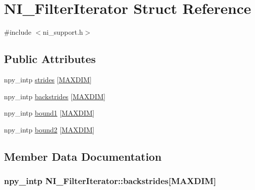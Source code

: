 \hypertarget{structNI__FilterIterator}{}\section{N\+I\+\_\+\+Filter\+Iterator Struct Reference}
\label{structNI__FilterIterator}


{\ttfamily \#include $<$ni\+\_\+support.\+h$>$}

\subsection*{Public Attributes}
\begin{DoxyCompactItemize}
\item 
npy\+\_\+intp \hyperlink{structNI__FilterIterator_a50a693fb2d87ac49ebee590fea850e52}{strides} \mbox{[}\hyperlink{nd__image_8h_a674c1a85fb1c09ec56b0b8f6319e7b97}{M\+A\+X\+D\+I\+M}\mbox{]}
\item 
npy\+\_\+intp \hyperlink{structNI__FilterIterator_ad447e7b690b7bc0d438d01a0f0247d12}{backstrides} \mbox{[}\hyperlink{nd__image_8h_a674c1a85fb1c09ec56b0b8f6319e7b97}{M\+A\+X\+D\+I\+M}\mbox{]}
\item 
npy\+\_\+intp \hyperlink{structNI__FilterIterator_a05e78616726cede7ef84b577cf8522fd}{bound1} \mbox{[}\hyperlink{nd__image_8h_a674c1a85fb1c09ec56b0b8f6319e7b97}{M\+A\+X\+D\+I\+M}\mbox{]}
\item 
npy\+\_\+intp \hyperlink{structNI__FilterIterator_a0c234e20b08ecb9cde20c3b1790c6958}{bound2} \mbox{[}\hyperlink{nd__image_8h_a674c1a85fb1c09ec56b0b8f6319e7b97}{M\+A\+X\+D\+I\+M}\mbox{]}
\end{DoxyCompactItemize}


\subsection{Member Data Documentation}
\hypertarget{structNI__FilterIterator_ad447e7b690b7bc0d438d01a0f0247d12}{}
\subsubsection[{backstrides}]{\setlength{\rightskip}{0pt plus 5cm}npy\+\_\+intp N\+I\+\_\+\+Filter\+Iterator\+::backstrides\mbox{[}{\bf M\+A\+X\+D\+I\+M}\mbox{]}}\label{structNI__FilterIterator_ad447e7b690b7bc0d438d01a0f0247d12}
\hypertarget{structNI__FilterIterator_a05e78616726cede7ef84b577cf8522fd}{}
